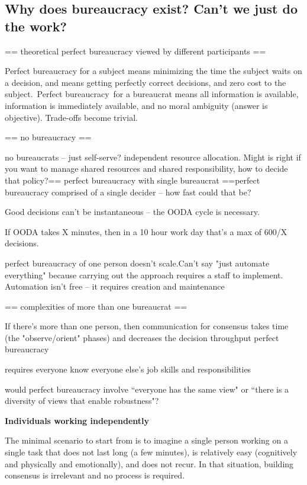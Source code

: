 \subsection{Why does bureaucracy exist? Can't we just do the work?}

== theoretical perfect bureaucracy viewed by different participants ==

Perfect bureaucracy for a subject means minimizing the time the subject waits on a decision, and means getting perfectly correct decisions, and zero cost to the subject. Perfect bureaucracy for a bureaucrat means all information is available, information is immediately available, and no moral ambiguity (answer is objective). Trade-offs become trivial.

== no bureaucracy ==

no bureaucrats -- just self-serve? independent resource allocation. Might is right
if you want to manage shared resources and shared responsibility, how to decide that policy?== perfect bureaucracy with single bureaucrat ==perfect bureaucracy comprised of a single decider -- how fast could that be?

Good decisions can't be instantaneous -- the OODA cycle is necessary.

If OODA takes X minutes, then in a 10 hour work day that's a max of 600/X decisions.

perfect bureaucracy of one person doesn't scale.Can't say "just automate everything" because carrying out the approach requires a staff to implement. Automation isn't free -- it requires creation and maintenance

== complexities of more than one bureaucrat ==

If there's more than one person, then communication for consensus takes time (the "observe/orient" phases) and decreases the decision throughput
perfect bureaucracy

requires everyone know everyone else's job skills and responsibilities

would perfect bureaucracy involve ``everyone has the same view" or ``there is a diversity of views that enable robustness"?

\textbf{Individuals working independently}

The minimal scenario to start from is to imagine a single person working on a single task that does not last long (a few minutes), is relatively easy (cognitively and physically and emotionally), and does not recur. In that situation, building consensus is irrelevant and no process is required. 


